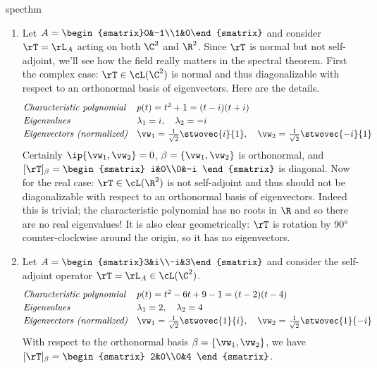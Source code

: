 \begin{examples}{}{specthm}
\begin{enumerate}
	\item Let $A=\begin{smatrix}0&-1\\1&0\end{smatrix}$ and consider $\rT=\rL_A$ acting on both $\C^2$ and $\R^2$. Since $\rT$ is normal but not self-adjoint, we'll see how the field really matters in the spectral theorem.\smallbreak
	First the complex case: $\rT\in\cL(\C^2)$ is normal and thus diagonalizable with respect to an orthonormal basis of eigenvectors. Here are the details.
	\[\def\arraystretch{1.2}\begin{array}{@{}ll}
		\text{\emph{Characteristic polynomial}} &p(t)=t^2+1=(t-i)(t+i)\\
		\text{\emph{Eigenvalues}} &\lambda_1=i,\quad \lambda_2=-i\\
		\text{\emph{Eigenvectors (normalized)}} &\vw_1=\frac 1{\sqrt{2}}\stwovec{i}{1},\quad \vw_2=\frac 1{\sqrt{2}}\stwovec{-i}{1}
	\end{array}\]
	Certainly $\ip{\vw_1,\vw_2}=0$, $\beta=\{\vw_1,\vw_2\}$ is orthonormal, and $[\rT]_\beta=\begin{smatrix}
	i&0\\0&-i
	\end{smatrix}$ is diagonal.\smallbreak	
	Now for the real case: $\rT\in\cL(\R^2)$ is not self-adjoint and thus should not be diagonalizable with respect to an orthonormal basis of eigenvectors. Indeed this is trivial; the characteristic polynomial has no roots in $\R$ and so there are no real eigenvalues! It is also clear geometrically: $\rT$ is rotation by \ang{90} counter-clockwise around the origin, so it has no eigenvectors.
	
	\item Let $A=\begin{smatrix}3&i\\-i&3\end{smatrix}$ and consider the self-adjoint operator $\rT=\rL_A\in\cL(\C^2)$.
	\[\def\arraystretch{1.2}\begin{array}{@{}ll}
		\text{\emph{Characteristic polynomial}} &p(t)=t^2-6t+9-1=(t-2)(t-4)\\
		\text{\emph{Eigenvalues}} &\lambda_1=2,\quad \lambda_2=4\\
		\text{\emph{Eigenvectors (normalized)}} &\vw_1=\frac 1{\sqrt{2}}\stwovec{1}{i},\quad \vw_2=\frac 1{\sqrt{2}}\stwovec{1}{-i}
	\end{array}\]
	With respect to the orthonormal basis $\beta=\{\vw_1,\vw_2\}$, we have $[\rT]_\beta=\begin{smatrix}
	2&0\\0&4
	\end{smatrix}$.
\end{enumerate}
\end{examples}
\goodbreak

